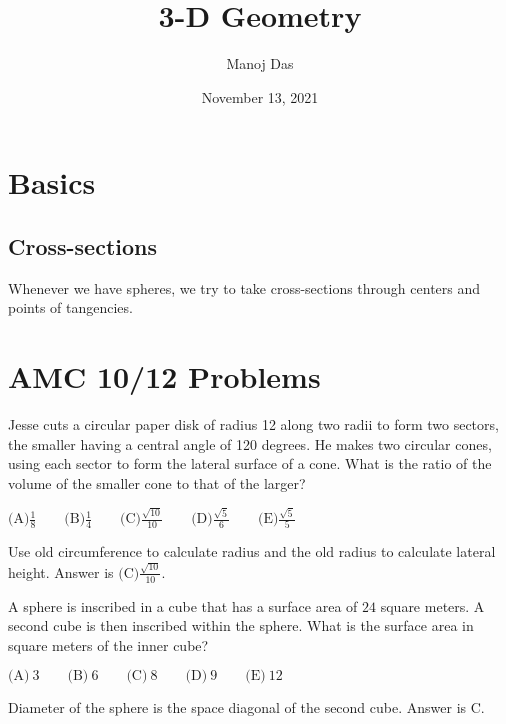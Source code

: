 \documentclass[11pt,twoside]{scrartcl}
\begin{document}
\title{3-D Geometry }

\author{Manoj Das}
\date{November 13, 2021}

\maketitle

\section{Basics}

\subsection{Cross-sections}
Whenever we have spheres, we try to take cross-sections through centers and points of tangencies.

\section{AMC 10/12 Problems}

\begin{problem}[2012 AMC 10 B, \#17]
    Jesse cuts a circular paper disk of radius 12 along two radii to form two sectors, the smaller having a central angle of 120 degrees. He makes two circular cones, using each sector to form the lateral surface of a cone. What is the ratio of the volume of the smaller cone to that of the larger?

$\text{(A)} \frac{1}{8} \qquad \text{(B)} \frac{1}{4} \qquad \text{(C)} \frac{\sqrt{10}}{10} \qquad \text{(D)} \frac{\sqrt{5}}{6} \qquad \text{(E)} \frac{\sqrt{5}}{5}$
    \begin{sketch}
       Use old circumference to calculate radius and the old radius to calculate lateral height. Answer is $\boxed{\text{(C)} \frac{\sqrt{10}}{10}}.$
    \end{sketch}
\end{problem}

\begin{problem}[2007 AMC 10 A, \#21]
    A sphere is inscribed in a cube that has a surface area of $24$ square meters. A second cube is then inscribed within the sphere. What is the surface area in square meters of the inner cube?

    $\text{(A)}\ 3 \qquad \text{(B)}\ 6 \qquad \text{(C)}\ 8 \qquad \text{(D)}\ 9 \qquad \text{(E)}\ 12$

    \begin{sketch}
       Diameter of the sphere is the space diagonal of the second cube.  Answer is $\boxed{\text{C}}.$
    \end{sketch}
\end{problem}
\end{document}
